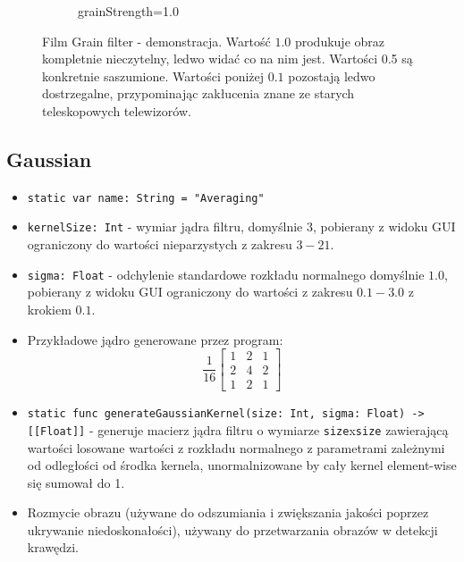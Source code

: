 \documentclass[a4paper]{article}
\begin{document}
\begin{figure}[H]
\begin{subfigure}{0.2\textwidth}
        \caption{grainStrength=1.0}
        \label{fig:trees_film_grain_1}
    \end{subfigure}
    \caption{Film Grain filter - demonstracja. Wartość $1.0$ produkuje obraz kompletnie nieczytelny, ledwo widać co na nim jest. Wartości 0.5 są konkretnie saszumione. Wartości poniżej $0.1$ pozostają ledwo dostrzegalne, przypominając zakłucenia znane ze starych teleskopowych telewizorów.}
    \label{fig:film_grain}
\end{figure}

\subsection{Gaussian}

\begin{itemize}
    \item \texttt{static var name: String = "Averaging"}
    \item \texttt{kernelSize: Int} - wymiar jądra filtru, domyślnie $3$, pobierany z widoku GUI ograniczony do wartości nieparzystych z zakresu $3-21$.
    \item \texttt{sigma: Float} - odchylenie standardowe rozkładu normalnego domyślnie $1.0$, pobierany z widoku GUI ograniczony do wartości z zakresu $0.1-3.0$ z krokiem $0.1$.
    \item Przykładowe jądro generowane przez program:
          $$
              \frac{1}{16}
              \begin{bmatrix}
                  1 & 2 & 1 \\
                  2 & 4 & 2 \\
                  1 & 2 & 1
              \end{bmatrix}
          $$
    \item \texttt{static func generateGaussianKernel(size: Int, sigma: Float) -> [[Float]]} - generuje macierz jądra filtru o wymiarze \texttt{size}x\texttt{size} zawierającą wartości losowane wartości z rozkładu normalnego z parametrami zależnymi od odległości od środka kernela, unormalnizowane by cały kernel element-wise się sumował do 1.
    \item Rozmycie obrazu (używane do odszumiania i zwiększania jakości poprzez ukrywanie niedoskonałości), używany do przetwarzania obrazów w detekcji krawędzi.
\end{itemize}
\end{document}
